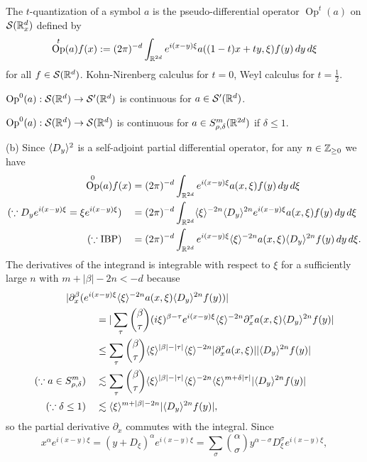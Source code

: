 \documentclass{../../large}
\DeclareMathOperator{\Op}{Op}
\begin{document}
\begin{prb}[Quantization]
The $t$-quantization of a symbol $a$ is the pseudo-differential operator $\Op^t(a)$ on $\mathcal{S}(\mathbb{R}_x^d)$ defined by
\[\Op^t(a)f(x):=(2\pi)^{-d}\int_{\R^{2d}}e^{i(x-y)\xi}a((1-t)x+ty,\xi)f(y)\,dy\,d\xi\]
for all $f\in\mathcal{S}(\mathbb{R}^d)$.
Kohn-Nirenberg calculus for $t=0$, Weyl calculus for $t=\frac12$.
\begin{parts}
\item $\Op^0(a):\cS(\R^d)\to\cS'(\R^d)$ is continuous for $a\in\mathcal{S}'(\mathbb{R}^d)$.
\item $\Op^0(a):\cS(\R^d)\to\cS(\R^d)$ is continuous for $a\in S_{\rho,\delta}^m(\mathbb{R}^{2d})$ if $\delta\le1$.
\end{parts}
\end{prb}
\begin{pf}
(b)
Since $\langle D_y\rangle^2$ is a self-adjoint partial differential operator, for any $n\in\mathbb{Z}_{\ge0}$ we have
\begin{align*}
\Op^0(a)f(x)
&=(2\pi)^{-d}\int_{\R^{2d}}e^{i(x-y)\xi}a(x,\xi)f(y)\,dy\,d\xi\\
(\because D_ye^{i(x-y)\xi}=\xi e^{i(x-y)\xi})\quad
&=(2\pi)^{-d}\int_{\R^{2d}}\<\xi\>^{-2n}\<D_y\>^{2n}e^{i(x-y)\xi}a(x,\xi)f(y)\,dy\,d\xi\\
(\because\text{IBP})\quad
&=(2\pi)^{-d}\int_{\R^{2d}}e^{i(x-y)\xi}\<\xi\>^{-2n}a(x,\xi)\<D_y\>^{2n}f(y)\,dy\,d\xi.
\end{align*}
The derivatives of the integrand is integrable with respect to $\xi$ for a sufficiently large $n$ with $m+|\beta|-2n<-d$ because
\begin{align*}
&\hspace{-3em}|\partial_x^\beta(e^{i(x-y)\xi}\<\xi\>^{-2n}a(x,\xi)\<D_y\>^{2n}f(y))|\\
&=|\sum_\tau{\beta\choose\tau}(i\xi)^{\beta-\tau}e^{i(x-y)\xi}\<\xi\>^{-2n}\partial_x^\tau a(x,\xi)\<D_y\>^{2n}f(y)|\\
&\le\sum_\tau{\beta\choose\tau}\<\xi\>^{|\beta|-|\tau|}\<\xi\>^{-2n}|\partial_x^\tau a(x,\xi)||\<D_y\>^{2n}f(y)|\\
(\because a\in S_{\rho,\delta}^m)\quad
&\lesssim\sum_\tau{\beta\choose\tau}\<\xi\>^{|\beta|-|\tau|}\<\xi\>^{-2n}\<\xi\>^{m+\delta|\tau|}|\<D_y\>^{2n}f(y)|\\
(\because\delta\le1)\quad
&\lesssim\<\xi\>^{m+|\beta|-2n}|\<D_y\>^{2n}f(y)|,
\end{align*}
so the partial derivative $\partial_x$ commutes with the integral.
Since
\[x^\alpha e^{i(x-y)\xi}=(y+D_\xi)^\alpha e^{i(x-y)\xi}=\sum_{\sigma}{\alpha\choose\sigma}y^{\alpha-\sigma}D_\xi^\sigma e^{i(x-y)\xi},\]

\end{pf}
\end{document}
